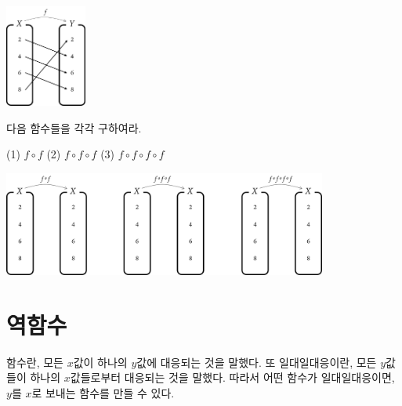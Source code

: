 \documentclass{oblivoir}
\begin{document}
%
\label{composition10}
\begin{center}
\includegraphics[width=0.2\textwidth]{composition_10-1}
\end{center}
\bigskip\bigskip
다음 함수들을 각각 구하여라.
\begin{flushleft}
\hspace{40pt}
(1) \(f\circ f\)
\hspace{50pt}
(2) \(f\circ f\circ f\)
\hspace{40pt}
(3) \(f\circ f\circ f\circ f\)
\end{flushleft}
\begin{center}
\includegraphics[width=0.8\textwidth]{composition_10-2}
\end{center}

\section{역함수}
함수란, 모든 \(x\)값이 하나의 \(y\)값에 대응되는 것을 말했다.
또 일대일대응이란, 모든 \(y\)값들이 하나의 \(x\)값들로부터 대응되는 것을 말했다.
따라서 어떤 함수가 일대일대응이면, \(y\)를 \(x\)로 보내는 함수를 만들 수 있다.
\end{document}

